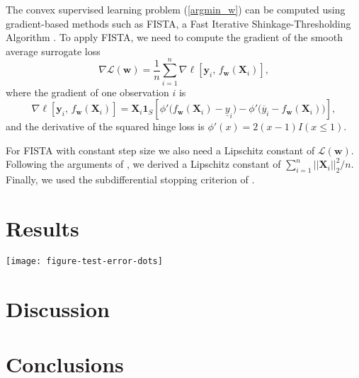 \documentclass{article} %
\begin{document}
The convex supervised learning problem (\ref{argmin_w}) can be
computed using gradient-based methods such as FISTA, a Fast Iterative
Shinkage-Thresholding Algorithm \citep{fista}. To apply FISTA, we need
to compute the gradient of the smooth average surrogate loss
\begin{equation}
  \label{eq:average_gradient}
  \nabla \mathcal L(\mathbf w) = 
  \frac 1 n
  \sum_{i=1}^n 
  \nabla \ell \left[
    \mathbf y_i,\,
    f_{\mathbf w}(  \mathbf X_i )
  \right],
\end{equation}
where the gradient of one observation $i$ is
\begin{equation}
  \label{eq:one_gradient}
  \nabla \ell \left[
    \mathbf y_i,\,
    f_{\mathbf w}( \mathbf X_i )
  \right]
  =
  \mathbf X_i \mathbf 1_S
  \left[
    \phi'\big(
    f_{\mathbf w}( \mathbf X_i ) - \underline y_i
    \big)
    -
    \phi'\big(
    \overline y_i - f_{\mathbf w}( \mathbf X_i )
    \big)
  \right],
\end{equation}
and the derivative of the squared hinge loss is $\phi'(x)=2(x-1)I(x\leq 1)$.

For FISTA with constant step size we also need a Lipschitz constant of
$\mathcal L(\mathbf w)$. Following the arguments of
\citet{hingeSquareFISTA}, we derived a Lipschitz constant of
$\sum_{i=1}^n ||\mathbf X_i||_2^2/n$. Finally, we used the
subdifferential stopping criterion of \citet{HOCKING-penalties}.


\section{Results}

\texttt{[image: figure-test-error-dots]}



\section{Discussion}

\section{Conclusions}



\end{document}
